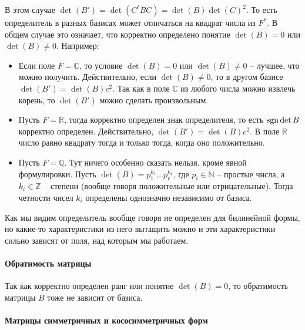 В этом случае $\det(B') = \det(C^t B C) = \det(B) \det (C)^2$.
То есть определитель в разных базисах может отличаться на квадрат числа из $F^*$.
В общем случае это означает, что корректно определено понятие $\det(B) = 0$ или $\det(B)\neq 0$.
Например:
\begin{itemize}
\item Если поле $F = \mathbb C$, то условие $\det(B) = 0$ или $\det(B)\neq 0$ -- лучшее, что можно получить.
Действительно, если $\det(B)\neq 0$, то в другом базисе $\det(B') = \det(B)c^2$.
Так как в поле $\mathbb C$ из любого числа можно извлечь корень, то $\det(B')$ можно сделать произвольным.

\item Пусть $F = \mathbb R$, тогда корректно определен знак определителя, то есть $\operatorname{sgn} \det B$ корректно определен.
Действительно, $\det(B') = \det(B) c^2$.
В поле $\mathbb R$ число равно квадрату тогда и только тогда, когда оно положительно.

\item Пусть $F = \mathbb Q$.
Тут ничего особенно сказать нельзя, кроме явной формулировки.
Пусть $\det(B) = p_1^{k_1}\ldots p_r^{k_r}$, где $p_i\in \mathbb N$ -- простые числа, а $k_i\in \mathbb Z$ -- степени (вообще говоря положительные или отрицательные).
Тогда четности чисел $k_i$ определены однозначно независимо от базиса.
\end{itemize}

Как мы видим определитель вообще говоря не определен для билинейной формы, но какие-то характеристики из него вытащить можно и эти характеристики сильно зависят от поля, над которым мы работаем.

\paragraph{Обратимость матрицы}

Так как корректно определен ранг или понятие $\det(B) = 0$, то обратимость матрицы $B$ тоже не зависит от базиса.

\paragraph{Матрицы симметричных и кососимметричных форм}

